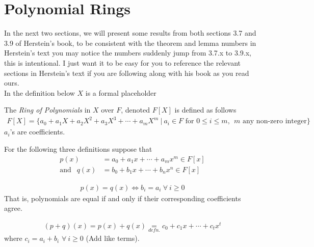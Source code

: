 \section{Polynomial Rings}
In the next two sections,  we will present some results from both sections 3.7 and 3.9 of Herstein's
book, to be consistent with the theorem and lemma numbers in Herstein's text you may notice the
numbers suddenly jump from 3.7.x to 3.9.x, this is intentional. I just want it to be easy for you to
reference the relevant sections in Herstein's text if you are following along with his book as you
read ours. \\
\newpage
\noindent In the definition below $X$ is a formal placeholder
\begin{definition}
    The \textit{Ring of Polynomials} in $X$ over $F$, denoted $F[X]$ is defined as follows
    \begin{align}
        F[X]= \{a_0 + a_1X + a_2X^2 + a_3X^3 + \cdots + a_m X^m \ | \ a_i \in F \text{ for } 0\leq i \leq m, \ \ m \text{ any non-zero integer}\} \nonumber
    \end{align}
    $a_i$'s are coefficients.
\end{definition}

\noindent For the following three definitions suppose that
\begin{align}
    p(x)&= a_0 + a_1x + \cdots + a_mx^m \in F[x] \nonumber \\
    \text{and } \ \ q(x)&= b_0+b_1x+\cdots + b_n x^n \in F[x] \nonumber
\end{align}

\begin{definition}
    \begin{align}
        p(x)=q(x) \iff b_i = a_i \ \forall \ i \geq 0 \nonumber
    \end{align}
    That is, polynomials are equal if and only if their corresponding coefficients agree.
\end{definition}

\begin{definition}
    \begin{align}
        (p+q)(x)= p(x)+q(x) \underset{defn.}{=}c_0 + c_1x + \cdots + c_t x^t \nonumber
    \end{align}
    where $c_i = a_i+b_i$ $\forall \ i\geq 0$ (Add like terms).
\end{definition}

